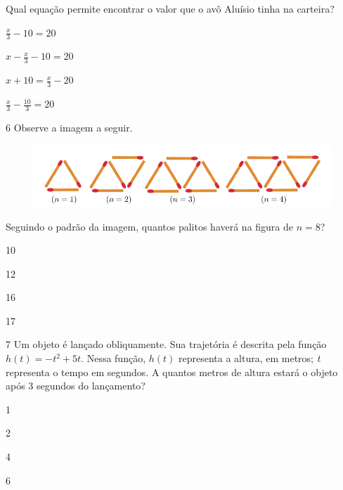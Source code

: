 Qual equação permite encontrar o valor que o avô Aluísio tinha na 
carteira?

\begin{escolha}

\item $\frac{x}{3} - 10 = 20$ 

\item $x - \frac{x}{3} - 10 = 20$ 

\item $x + 10 = \frac{x}{3} - 20$ 

\item $\frac{x}{3} - \frac{10}{3} = 20$ 

\end{escolha}

\pagebreak
\num{6} Observe a imagem a seguir.

\begin{figure}[htpb!]
\centering
\includegraphics[width=\textwidth]{./tikz/046.pdf}
\end{figure}

Seguindo o padrão da imagem, quantos palitos haverá na figura de $n = 8$?

\begin{multicols}{2}
\begin{escolha}

  \item 10

  \item 12

  \item 16

  \item 17

\end{escolha}
\end{multicols}

\num{7} Um objeto é lançado obliquamente. Sua trajetória é descrita pela
função $h(t) = - t^{2} + 5t$. Nessa função, $h(t)$ representa a altura, em
metros; \textit{t} representa o tempo em segundos. A quantos metros de altura
estará o objeto após 3 segundos do lançamento?

\begin{escolha}

  \item 1

  \item 2

  \item 4

  \item 6

\end{escolha}


